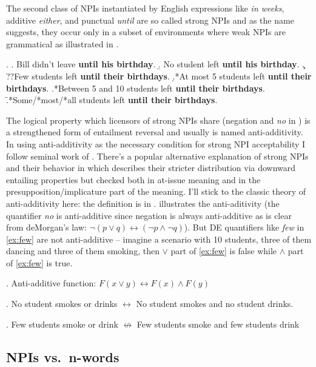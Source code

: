 \documentclass[12pt]{scrartcl}
\begin{document}
The second class of NPIs instantiated by English expressions like  \emph{in weeks}, additive \emph{either}, and punctual \emph{until} are so called strong NPIs and as the name suggests, they occur only in a subset of environments where weak NPIs are grammatical as illustrated in \Next.


\ex. \a. Bill didn't leave \textbf{until his birthday}. \b. No student
left \textbf{until his birthday}. \c. ??Few students left \textbf{until
their birthdays}. \d.*At most 5 students left \textbf{until their
birthdays}. \e.*Between 5 and 10 students left \textbf{until their
birthdays}. \f.*Some/*most/*all students left \textbf{until their
birthdays}.

The logical property which licensors of strong NPIs share (negation and \textit{no} in \Last) is a strengthened form of entailment reversal and usually is named anti-additivity. In using anti-additivity as the necessary condition for strong NPI acceptability I follow seminal work of \cite{zwarts1998three}. There's a popular alternative explanation of strong NPIs and their behavior in \cite{gajewski2011licensing} which describes their stricter distribution via downward entailing properties but checked both in at-issue meaning and in the presupposition/implicature part of the meaning. I'll stick to the classic theory of anti-additivity here: the definition is in \Next. \NNext illustrates the anti-aditivity (the quantifier \textit{no} is anti-additive since negation is always anti-additive as is clear from deMorgan's law: $\neg(p \vee q) \leftrightarrow (\neg p \wedge \neg q)$). But DE quantifiers like \textit{few} in \ref{ex:few} are not anti-additive -- imagine a scenario with 10 students, three of them dancing and three of them smoking, then $\vee$ part of \ref{ex:few} is false while $\wedge$ part of \ref{ex:few} is true.



\ex. Anti-additive function:
\(F(x \vee y) \leftrightarrow F(x) \wedge F(y)\)

\ex. No student smokes or drinks \(\leftrightarrow\) No student smokes
and no student drinks.

\ex. Few students smoke or drink \(\not\leftrightarrow\) Few students
smoke and few students drink \label{ex:few}


\hypertarget{npis-vs.n-words-modularity}{%
\subsection{NPIs vs.~n-words}\label{npis-vs.n-words-modularity}}
\end{document}
